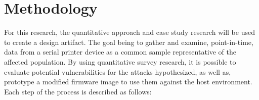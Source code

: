 

\section{Methodology}  \label{methodology}

For this research, the quantitative approach and case study research will be used \autocite{babbie2017basics,creswell2017research} to create a design artifact. The goal being to gather and examine, point-in-time, data from a serial printer device as a common sample representative of the affected population. By using quantitative survey research, it is possible to evaluate potential vulnerabilities for the attacks hypothesized, as well as, prototype a modified firmware image to use them against the host environment. Each step of the process is described as follows:

% 


